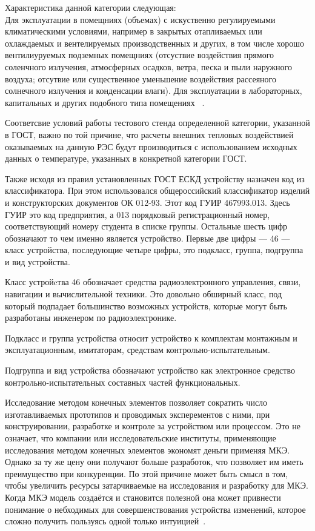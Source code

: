 Характеристика данной категории следующая:\\
Для эксплуатации в помещниях (объемах) с искуственно регулируемыми
климатическими условиями, например в закрытых отапливаемых или
охлаждаемых и вентелируемых производственных и других, в том числе
хорошо вентилиуруемых подземных помещниях (отсуствие воздействия
прямого соленчного излучения, атмосферных осадков, ветра, песка и пыли
наружного воздуха; отсутвие или существенное уменьшение воздействия
рассеяного солнечного излучения и конденсации влаги). Для эксплуатации
в лабораторных, капитальных и других подобного типа помещениях ~\cite{GOST-15150-69}.

Соответсвие условий работы тестового стенда определенной категории,
указанной в ГОСТ, важно по той причине,
что расчеты внешних тепловых воздействией оказываемых на данную РЭС будут производиться с использованием исходных данных о температуре,
указанных в конкретной категории ГОСТ.


Также исходя из правил установленных ГОСТ ЕСКД устройству назначен код из классификатора.
При этом использовался общероссийский классификатор изделий и конструкторских документов ОК 012-93.
Этот код ГУИР 467993.013. Здесь ГУИР это код предприятия, а 013 порядковый регистрационный номер,
соответствующий номеру студента в списке группы.
Остальные шесть цифр обозначают то чем именно является устройство.
Первые две цифры — 46 — класс устройства, последующие четыре цифры,
это подкласс, группа, подгруппа и вид устройства.

Класс устройcтва 46 обозначает средства радиоэлектронного управления, связи, навигации и вычислительной техники.
Это довольно обширный класс, под который подпадает большинство возможных устройств,
которые могут быть разработаны инженером по радиоэлектронике.

Подкласс и группа устройства относит устройство к комплектам монтажным и эксплуатационным,
имитаторам, средствам контрольно-испытательным.

Подгруппа и вид устройства обозначают устройство как электронное средство контрольно-испытательных составных частей функциональных.

Исследование методом конечных элементов
позволяет сократить число изготавливаемых прототипов и проводимых эксперементов с ними,
при конструировании, разработке и контроле за устройством или процессом.
Это не означает, что компании или исследовательские институты,
применяющие исследования методом конечных элементов экономят деньги применяя МКЭ.
Однако за ту же цену они получают больше разработок,
что позволяет им иметь преимущество при конкуренции.
По этой причине может быть смысл в том,
чтобы увеличить ресурсы затарчиваемые на исследования и разработку для МКЭ.
Когда МКЭ модель создаётся и становится полезной она может привнести
понимание о небходимых для совершенствования устройства изменений,
которое сложно получить пользуясь одной только интуицией~\cite{MULTIPHYSICS-CYCLOPEDIA-FEM}.


